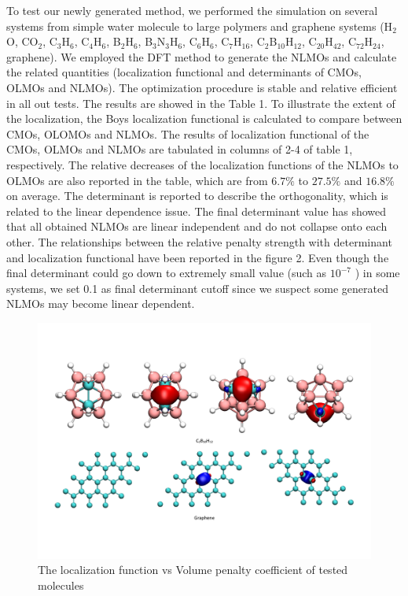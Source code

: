 \documentclass[aps,prl,reprint,amsmath,amssymb]{revtex4-1}
\begin{document}
To test our newly generated method, we performed the simulation on several systems from simple water molecule to large polymers and graphene systems (H$_2$O, CO$_2$, C$_3$H$_6$, C$_4$H$_6$, B$_2$H$_6$, B$_3$N$_3$H$_6$, C$_6$H$_6$, C$_7$H$_{16}$, C$_2$B$_{10}$H$_{12}$, C$_{20}$H$_{42}$, C$_{72}$H$_{24}$, graphene).
We employed the DFT method to generate the NLMOs and calculate the related quantities (localization functional and determinants of CMOs, OLMOs and NLMOs).
The optimization procedure is stable and relative efficient in all out tests.
The results are showed in the Table 1. 
To illustrate the extent of the localization,  the Boys localization functional is calculated to compare between CMOs, OLOMOs and NLMOs.
The results of localization functional of the CMOs, OLMOs and NLMOs are tabulated in columns of 2-4 of table 1, respectively.
The relative decreases of the localization functions of the NLMOs to OLMOs are also reported in the table, which are from $6.7\%$ to $27.5\%$ and $16.8\%$ on average.
The determinant is reported to describe the orthogonality, which is related to the linear dependence issue.
The final determinant value has showed that all obtained NLMOs are linear independent and do not collapse onto each other.
The relationships between the relative penalty strength with determinant and localization functional have been reported in the figure 2. Even though the final determinant could go down to extremely small value (such as $10^{-7}$ ) in some systems, we set 0.1 as final determinant cutoff since we suspect some generated NLMOs may become linear dependent.
 
\begin{figure}[hbpt]
\centering
\includegraphics[width=\textwidth]{figure_2.pdf}
\caption{The localization function vs Volume penalty coefficient of tested molecules}
\end{figure}
\end{document}
